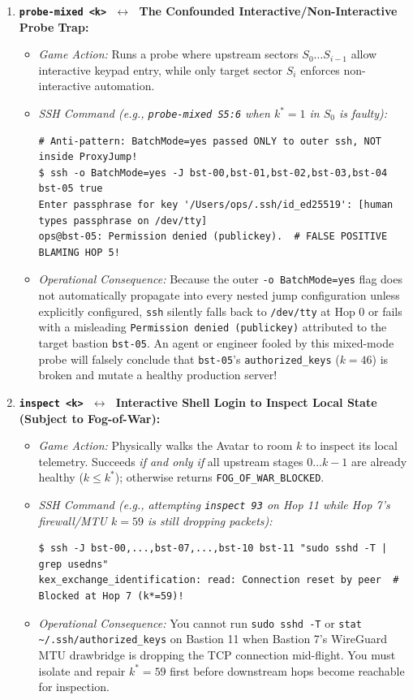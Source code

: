 \documentclass[11pt,a4paper]{article}
\theoremstyle{definition}
\theoremstyle{remark}
\begin{document}
\begin{enumerate}[leftmargin=1.6em]
    \item \textbf{\texttt{probe-mixed <k>} $\;\longleftrightarrow\;$ The Confounded Interactive/Non-Interactive Probe Trap:}
    \begin{itemize}
        \item \emph{Game Action:} Runs a probe where upstream sectors $S_0 \dots S_{i-1}$ allow interactive keypad entry, while only target sector $S_i$ enforces non-interactive automation.
        \item \emph{SSH Command (e.g., \texttt{probe-mixed S5:6} when $k^* = 1$ in $S_0$ is faulty):}
        \begin{lstlisting}[style=c99style]
# Anti-pattern: BatchMode=yes passed ONLY to outer ssh, NOT inside ProxyJump!
$ ssh -o BatchMode=yes -J bst-00,bst-01,bst-02,bst-03,bst-04 bst-05 true
Enter passphrase for key '/Users/ops/.ssh/id_ed25519': [human types passphrase on /dev/tty]
ops@bst-05: Permission denied (publickey).  # FALSE POSITIVE BLAMING HOP 5!
        \end{lstlisting}
        \item \emph{Operational Consequence:} Because the outer \texttt{-o BatchMode=yes} flag does not automatically propagate into every nested jump configuration unless explicitly configured, \texttt{ssh} silently falls back to \texttt{/dev/tty} at Hop 0 or fails with a misleading \texttt{Permission denied (publickey)} attributed to the target bastion \texttt{bst-05}. An agent or engineer fooled by this mixed-mode probe will falsely conclude that \texttt{bst-05}'s \texttt{authorized\_keys} ($k=46$) is broken and mutate a healthy production server!
    \end{itemize}

    \item \textbf{\texttt{inspect <k>} $\;\longleftrightarrow\;$ Interactive Shell Login to Inspect Local State (Subject to Fog-of-War):}
    \begin{itemize}
        \item \emph{Game Action:} Physically walks the Avatar to room $k$ to inspect its local telemetry. Succeeds \emph{if and only if} all upstream stages $0 \dots k-1$ are already healthy ($k \le k^*$); otherwise returns \texttt{FOG\_OF\_WAR\_BLOCKED}.
        \item \emph{SSH Command (e.g., attempting \texttt{inspect 93} on Hop 11 while Hop 7's firewall/MTU $k=59$ is still dropping packets):}
        \begin{lstlisting}[style=c99style]
$ ssh -J bst-00,...,bst-07,...,bst-10 bst-11 "sudo sshd -T | grep usedns"
kex_exchange_identification: read: Connection reset by peer  # Blocked at Hop 7 (k*=59)!
        \end{lstlisting}
        \item \emph{Operational Consequence:} You cannot run \texttt{sudo sshd -T} or \texttt{stat \textasciitilde/.ssh/authorized\_keys} on Bastion 11 when Bastion 7's WireGuard MTU drawbridge is dropping the TCP connection mid-flight. You must isolate and repair $k^*=59$ first before downstream hops become reachable for inspection.
    \end{itemize}


\end{enumerate}
\end{document}
